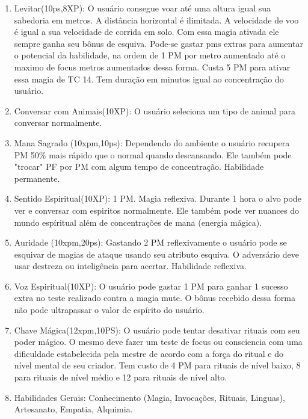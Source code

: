 \begin{enumerate}
\item Levitar(10ps,8XP): O usuário consegue voar até uma altura igual sua sabedoria em metros. A distância horizontal é ilimitada. A velocidade de voo é igual a sua velocidade de corrida em solo. Com essa magia ativada ele sempre ganha seu bônus de esquiva. Pode-se gastar pms extras para aumentar o potencial da habilidade, na ordem de 1 PM por metro aumentado até o maximo de focus metros aumentados dessa forma. Custa 5 PM para ativar essa magia de TC 14. Tem duração em minutos igual ao concentração do usuário.
 	
 	 	\item Conversar com Animais(10XP): O usuário seleciona um tipo de animal para conversar normalmente. 
  
  	  
	 	\item Mana Sagrado (10xpm,10ps): Dependendo do ambiente o usuário recupera PM 50\% mais rápido que o normal quando descansando. Ele também pode "trocar" PF por PM com algum tempo de concentração. Habilidade permanente.  
  	
	 	\item Sentido Espiritual(10XP): 1 PM. Magia reflexiva.\newline
Durante 1 hora o alvo pode ver e conversar com espiritos normalmente. Ele também pode ver nuances do mundo espíritual além de concentrações de mana (energia mágica). 
  
	\item Auridade (10xpm,20ps): Gastando 2 PM reflexivamente o usuário pode se esquivar de magias de ataque usando seu atributo esquiva. O adversário deve usar destreza ou inteligência para acertar. Habilidade reflexiva. 
		
	\item  Voz Espiritual(10XP): O usuário pode gastar 1 PM para ganhar 1 sucesso extra no teste realizado contra a magia mute. O bônus recebido dessa forma não pode ultrapassar o valor de espírito do usuário.

	\item  Chave Mágica(12xpm,10PS): O usuário pode tentar desativar rituais com seu poder mágico. O mesmo deve fazer um teste de focus ou consciencia com uma dificuldade estabelecida pela mestre de acordo com a força do ritual e do nível mental de seu criador. Tem custo de 4 PM para rituais de nível baixo, 8 para rituais de nível médio e 12 para rituais de nível alto.

  \item Habilidades Gerais: Conhecimento (Magia, Invocações, Rituais, Linguas), Artesanato, Empatia, Alquimia.

\end{enumerate}


